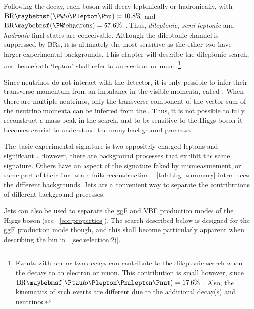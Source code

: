 
Following the \HWW decay, each \PW boson will decay leptonically or hadronically, with 
$\text{BR}\parenths{\HepProcess{\PW\HepTo\Plepton\Pnu}} = 10.8\%$ and 
$\text{BR}\parenths{\HepProcess{\PW\HepTo \text{hadrons}}} = 67.6\%$ \cite{PDG:2012}. 
Thus, \textit{dileptonic}, \textit{semi-leptonic} and \textit{hadronic} final states are 
conceivable. Although the dileptonic channel is suppressed by \acp{BR}, it is ultimately 
the most sensitive as the other two have larger experimental backgrounds. This chapter 
will describe the dileptonic search, and henceforth 
`lepton' shall refer to an electron or muon.\footnote{
	Events with one or two \HepProcess{\PW\HepTo\Ptau\Pnu} decays can 
	contribute to the dileptonic search when the \Ptau decays to an electron or muon. This 
	contribution is small however, since
	$\text{BR}\parenths{\HepProcess{\Ptau\HepTo\Plepton\Pnulepton\Pnut}} = 17.6\%$ 
	\cite{PDG:2012}. Also, the kinematics of such events are different due to the 
	additional decay(s) and neutrinos.
}

Since neutrinos do not interact with the detector, it is only possible to infer their 
transverse momentum from an imbalance in the visible momenta, called \met. When there are 
multiple neutrinos, only the transverse component of the vector sum of the neutrino 
momenta can be inferred from the \met. Thus, it is not possible to fully reconstruct a 
mass peak in the \HWWlvlv search, and to be sensitive to the Higgs boson it becomes 
crucial to understand the many background processes.

The basic experimental signature is two oppositely charged leptons and significant \met. 
However, there are background processes that exhibit the same signature. Others have an 
aspect of the signature faked by mismeasurement, or some part of their final state fails 
reconstruction. \Table~\ref{tab:bkg_summary} introduces the different backgrounds. Jets 
are a convenient way to separate the contributions of different background processes.

Jets can also be used to separate the \ac{ggF} and \ac{VBF} production modes of the Higgs 
boson (see \Section~\ref{sec:properties}). The search described below is designed for the 
\ac{ggF} production mode though, and this shall become particularly apparent when 
describing the \twojet bin in \Section~\ref{sec:selection:2j}.

